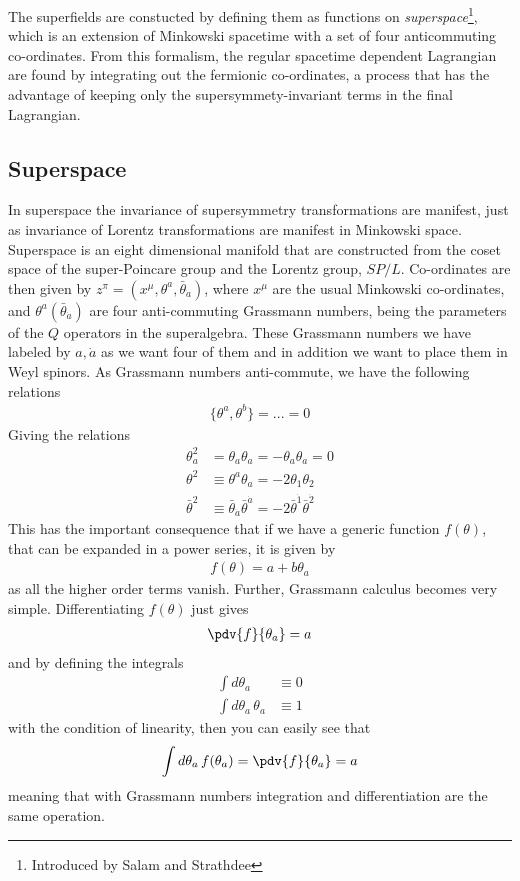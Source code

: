 The superfields are constucted by defining them as functions on \textit{superspace}\footnote{Introduced by Salam and Strathdee}, which is an extension of Minkowski spacetime with a set of four anticommuting co-ordinates. From this formalism, the regular spacetime dependent Lagrangian are found by integrating out the fermionic co-ordinates, a process that has the advantage of keeping only the supersymmety-invariant terms in the final Lagrangian.

\subsection{Superspace}
In superspace the invariance of supersymmetry transformations are manifest, just as invariance of Lorentz transformations are manifest in Minkowski space. Superspace is an eight dimensional manifold that are constructed from the coset space of the super-Poincare group and the Lorentz group, $SP/L$. Co-ordinates are then given by $z^{\pi}=(x^{\mu},\theta^{a},\bar{\theta}_{\dot{a}})$, where $x^{\mu}$ are the usual Minkowski co-ordinates, and $\theta^{a}(\bar{\theta}_{\dot{a}})$ are four anti-commuting Grassmann numbers, being the parameters of the $Q$ operators in the superalgebra. These Grassmann numbers we have labeled by $a,\dot{a}$ as we want four of them and in addition we want to place them in Weyl spinors. As Grassmann numbers anti-commute, we have the following relations
\begin{align}
    \{\theta^{a},\theta^{b}\}=...=0
\end{align}
Giving the relations
\begin{align}
    \theta_{a}^{2}&=\theta_{a}\theta_{a}=-\theta_{a}\theta_{a}=0
    \\
    \theta^{2}&\equiv\theta^{a}\theta_{a}=-2\theta_{1}\theta_{2}
    \\
    \bar{\theta}^{2}&\equiv\bar{\theta}_{\dot{a}}\bar{\theta}^{\dot{a}}=-2\bar{\theta}^{\dot{1}}\bar{\theta}^{\dot{2}}
\end{align}
This has the important consequence that if we have a generic function $f(\theta)$, that can be expanded in a power series, it is given by
\begin{align*}
    f(\theta)=a+b\theta_{a}
\end{align*}
as all the higher order terms vanish. Further, Grassmann calculus becomes very simple. Differentiating $f(\theta)$ just gives
\begin{align}
    \pdv{f}{\theta_{a}}=a
\end{align}
and by defining the integrals
\begin{align}
    \int d\theta_{a}&\equiv0
    \\
    \int d\theta_{a}\,\theta_{a}&\equiv1
\end{align}
with the condition of linearity, then you can easily see that
\begin{align}
    \int d\theta_{a}\,f(\theta_{a})=\pdv{f}{\theta_{a}}=a
\end{align}
meaning that with Grassmann numbers integration and differentiation are the same operation.

